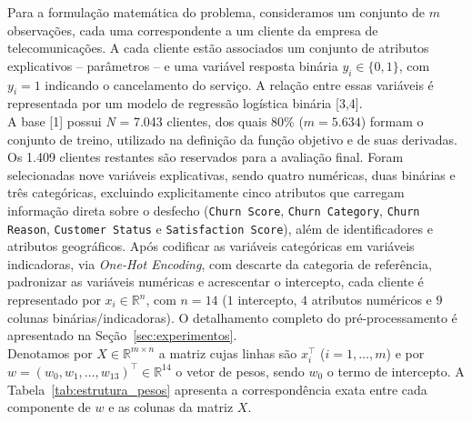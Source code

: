 \documentclass{article}
\theoremstyle{remark}
\begin{document}
Para a formulação matemática do problema, consideramos um conjunto de $m$ observações, cada uma correspondente a um cliente da empresa de telecomunicações. A cada cliente estão associados um conjunto de atributos explicativos -- parâmetros -- e uma variável resposta binária $y_i \in \{0,1\}$, com $y_i = 1$ indicando o cancelamento do serviço. A relação entre essas variáveis é representada por um modelo de regressão logística binária [3,4].\\

A base [1] possui \textit{N} = 7.043 clientes, dos quais 80\% ($m = 5.634$) formam o conjunto de treino, utilizado na definição da função objetivo e de suas derivadas. Os 1.409 clientes restantes são reservados para a avaliação final. Foram selecionadas nove variáveis explicativas, sendo quatro numéricas, duas binárias e três categóricas, excluindo explicitamente cinco atributos que carregam informação direta sobre o desfecho (\texttt{Churn Score}, \texttt{Churn Category}, \texttt{Churn Reason}, \texttt{Customer Status} e \texttt{Satisfaction Score}), além de identificadores e atributos geográficos. Após codificar as variáveis categóricas em variáveis indicadoras, via \textit{One-Hot Encoding}, com descarte da categoria de referência, padronizar as variáveis numéricas e acrescentar o intercepto, cada cliente é representado por $x_i \in \mathbb{R}^n$, com $n = 14$ ($1$ intercepto, $4$ atributos numéricos e $9$ colunas binárias/indicadoras). O detalhamento completo do pré-processamento é apresentado na Seção~\ref{sec:experimentos}.\\

Denotamos por $X \in \mathbb{R}^{m \times n}$ a matriz cujas linhas são $x_i^{\top}$ ($i = 1, \dots, m$) e por $w = (w_0, w_1, \dots, w_{13})^{\top} \in \mathbb{R}^{14}$ o vetor de pesos, sendo $w_0$ o termo de intercepto. A Tabela~\ref{tab:estrutura_pesos} apresenta a correspondência exata entre cada componente de $w$ e as colunas da matriz $X$.
\end{document}
